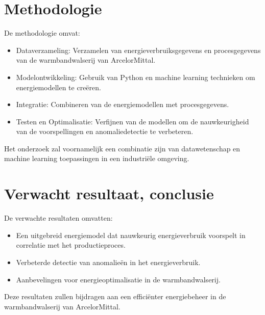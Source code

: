 \section{Methodologie}%
\label{sec:methodologie}

De methodologie omvat:
\begin{itemize}
  \item Dataverzameling: Verzamelen van energieverbruiksgegevens en procesgegevens van de warmbandwalserij van ArcelorMittal.
  \item Modelontwikkeling: Gebruik van Python en machine learning technieken om energiemodellen te creëren.
  \item Integratie: Combineren van de energiemodellen met procesgegevens.
  \item Testen en Optimalisatie: Verfijnen van de modellen om de nauwkeurigheid van de voorspellingen en anomaliedetectie te verbeteren.
\end{itemize}
Het onderzoek zal voornamelijk een combinatie zijn van datawetenschap en machine learning toepassingen in een industriële omgeving.

\section{Verwacht resultaat, conclusie}%
\label{sec:verwachte_resultaten}

De verwachte resultaten omvatten:
\begin{itemize}
  \item Een uitgebreid energiemodel dat nauwkeurig energieverbruik voorspelt in correlatie met het productieproces.
  \item Verbeterde detectie van anomalieën in het energieverbruik.
  \item Aanbevelingen voor energieoptimalisatie in de warmbandwalserij.
\end{itemize}
Deze resultaten zullen bijdragen aan een efficiënter energiebeheer in de warmbandwalserij van ArcelorMittal.

